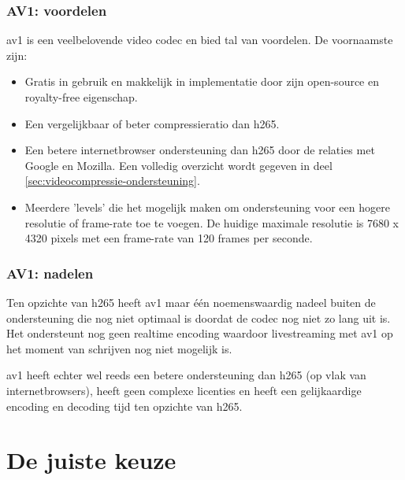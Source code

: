 \subsubsection{AV1: voordelen}
\label{sec:videocompressie-av1-voordelen}

\Gls{av1} is een veelbelovende video \gls{codec} en bied tal van voordelen. De voornaamste zijn:

\begin{itemize}
	
	\item Gratis in gebruik en makkelijk in implementatie door zijn \gls{open-source} en royalty-free eigenschap.
	
	\item Een vergelijkbaar of beter \gls{compressieratio} dan \gls{h265}.
	
	\item Een betere internetbrowser ondersteuning dan \gls{h265} door de relaties met Google en Mozilla. Een volledig overzicht wordt gegeven in deel \ref{sec:videocompressie-ondersteuning}.
	
	\item Meerdere 'levels' die het mogelijk maken om ondersteuning voor een hogere resolutie of \gls{frame-rate} toe te voegen. De huidige maximale resolutie is 7680 x 4320 \glspl{pixel} met een \gls{frame-rate} van 120 \glspl{frame} per seconde.
	
\end{itemize}

\subsubsection{AV1: nadelen}
\label{sec:videocompressie-av1-nadelen}

Ten opzichte van \gls{h265} heeft \gls{av1} maar één noemenswaardig nadeel buiten de ondersteuning die nog niet optimaal is doordat de \gls{codec} nog niet zo lang uit is. Het ondersteunt nog geen realtime \gls{encoding} waardoor livestreaming met \gls{av1} op het moment van schrijven nog niet mogelijk is.

\Gls{av1} heeft echter wel reeds een betere ondersteuning dan \gls{h265} (op vlak van internetbrowsers), heeft geen complexe licenties en heeft een gelijkaardige \gls{encoding} en \gls{decoding} tijd ten opzichte van \gls{h265}.  

\section{De juiste keuze}
\label{sec:videocompressie-keuze}

